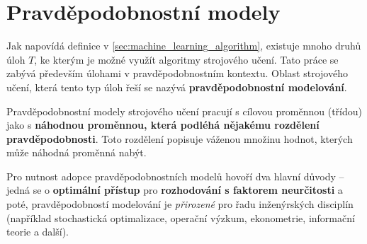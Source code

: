 \section{Pravděpodobnostní modely}
Jak napovídá definice v \autoref{sec:machine_learning_algorithm}, existuje mnoho druhů úloh $T$, ke kterým je možné využít algoritmy strojového učení.
Tato práce se zabývá především úlohami v pravděpodobnostním kontextu. Oblast strojového učení, která tento typ úloh řeší se nazývá \textbf{pravděpodobnostní modelování}. 

Pravděpodobnostní modely strojového učení pracují s cílovou proměnnou (třídou) jako s \textbf{náhodnou proměnnou, která podléhá nějakému rozdělení pravděpodobnosti}.
Toto rozdělení popisuje váženou množinu hodnot, kterých může náhodná proměnná nabýt. \cite{Murphy2022}

Pro nutnost adopce pravděpodobnostních modelů hovoří dva hlavní důvody
– jedná se o \textbf{optimální přístup} pro \textbf{rozhodování s faktorem neurčitosti}
a poté, pravděpodobností modelování je \emph{přirozené} pro řadu inženýrských disciplín (například stochastická optimalizace, operační výzkum, ekonometrie, informační teorie a další). \cite{Murphy2022}


